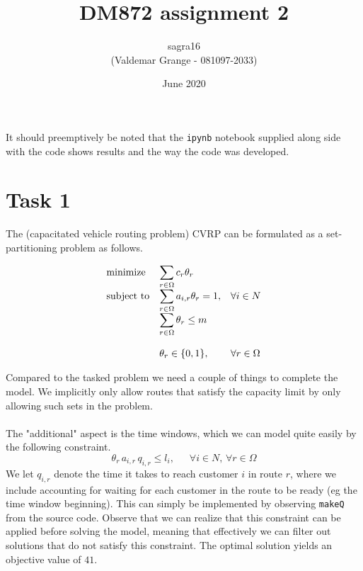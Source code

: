 \documentclass{article}
\title{DM872 assignment 2}
\author{sagra16 \\(Valdemar Grange - 081097-2033) }
\date{June 2020}
\begin{document}
    \maketitle
    It should preemptively be noted that the \texttt{ipynb} notebook supplied along side with the code shows results and the way the code was developed.
    
    \clearpage

    \section*{Task 1}
    The (capacitated vehicle routing problem) CVRP can be formulated as a set-partitioning problem as follows.

    \begin{equation*}
        \begin{array}{ll@{}ll}
            \text{minimize}  & \displaystyle\sum_{r \in \Omega} c_r \theta_r& &\\
            \text{subject to}& \displaystyle\sum_{r \in \Omega} a_{i, r} \theta_r = 1 ,&   &\forall i \in N\\
                             & \displaystyle\sum_{r \in \Omega} \theta_r \leq m &&\\\\
                             & \displaystyle \theta_r  \in \{0,1\},  && \forall r \in \Omega
        \end{array}
    \end{equation*}
    
    Compared to the tasked problem we need a couple of things to complete the model.
    We implicitly only allow routes that satisfy the capacity limit by only allowing such sets in the problem.\\\\
    The "additional" aspect is the time windows, which we can model quite easily by the following constraint.
    \[
    \theta_r \, a_{i,r} \, q_{i,r} \leq l_i   , \,\,\,\,\,\,\,\,\, \forall i \in N, \, \forall r \in \Omega
    \]
    We let $q_{i,r}$ denote the time it takes to reach customer $i$ in route $r$, where we include accounting for waiting for each customer in the route to be ready (eg the time window beginning).
    This can simply be implemented by observing \texttt{makeQ} from the source code.
    Observe that we can realize that this constraint can be applied before solving the model, meaning that effectively we can filter out solutions that do not satisfy this constraint.
    The optimal solution yields an objective value of $41$.
\end{document}
